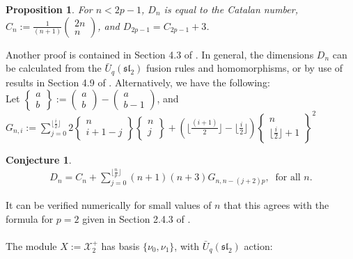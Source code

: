 \documentclass[]{article}
\newtheorem{prop}{Proposition}[section]
\newtheorem{conj}{Conjecture}[section]
\begin{document}
\begin{prop}\label{prop1}
For $n<2p-1$, $D_{n}$ is equal to the Catalan number, $C_{n}:=\frac{1}{(n+1)}\left(\begin{array}{c}2n\\n\end{array}\right)$, and $D_{2p-1}=C_{2p-1}+3$.
\end{prop} 
Another proof is contained in Section 4.3 of \cite{MeThesis}. In general, the dimensions $D_{n}$ can be calculated from the $\bar{U}_{q}(\mathfrak{sl}_{2})$ fusion rules and homomorphisms, or by use of results in Section 4.9 of \cite{GST}. Alternatively, we have the following:\\

Let $\left\{\begin{array}{c}a\\b\end{array}\right\}:=\left(\begin{array}{c}a\\b\end{array}\right)-\left(\begin{array}{c}a\\b-1\end{array}\right)$, and\\ $G_{n,i}:=\sum\limits_{j=0}^{\lfloor\frac{i}{2}\rfloor}2\left\{\begin{array}{c}n\\i+1-j\end{array}\right\}\left\{\begin{array}{c}n\\j\end{array}\right\}+\left(\lfloor\frac{(i+1)}{2}\rfloor-\lfloor\frac{i}{2}\rfloor\right)\left\{\begin{array}{c}n\\\lfloor\frac{i}{2}\rfloor+1\end{array}\right\}^{2}$	
\begin{conj}
\begin{align*}
D_{n}=C_{n}+\sum\limits_{j=0}^{\lfloor\frac{n}{p}\rfloor}(n+1)(n+3)G_{n,n-(j+2)p}, \:\text{ for all $n$.}
\end{align*}
\end{conj}
It can be verified numerically for small values of $n$ that this agrees with the formula for $p=2$ given in Section 2.4.3 of \cite{GST}.\\ \\
The module $X:=\mathcal{X}^{+}_{2}$ has basis $\{\nu_{0},\nu_{1}\}$, with $\bar{U}_{q}(\mathfrak{sl}_{2})$ action:
\end{document}
